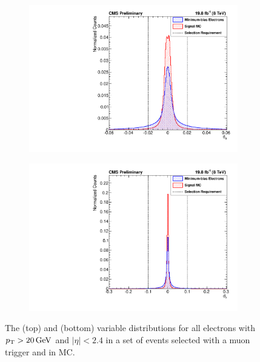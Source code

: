 \begin{figure}[!htbp]
    \centering
    \begin{subfigure}[b]{\StackedPlotWidth}
        \includegraphics[width=\textwidth]{figures/e_reco_var_d0.pdf}
        \caption{}
        \label{fig:d0}
    \end{subfigure}
    \begin{subfigure}[b]{\StackedPlotWidth}
        \includegraphics[width=\textwidth]{figures/e_reco_var_dz.pdf}
        \caption{}
        \label{fig:dz}
    \end{subfigure}
    \caption[
        Distributions of \dzero and \dz in data and MC.
    ]{
        The \dzero (top) and \dz (bottom) variable distributions for all
        electrons with $p_{\mathrm{T}} > 20 \,\text{Ge\hspace{-.08em}V}$ and $|\eta| < 2.4$ in a set of events
        selected with a muon trigger and in \MADGRAPH \Ztoee MC.
    }
    \label{fig:d0_dz}
\end{figure}

